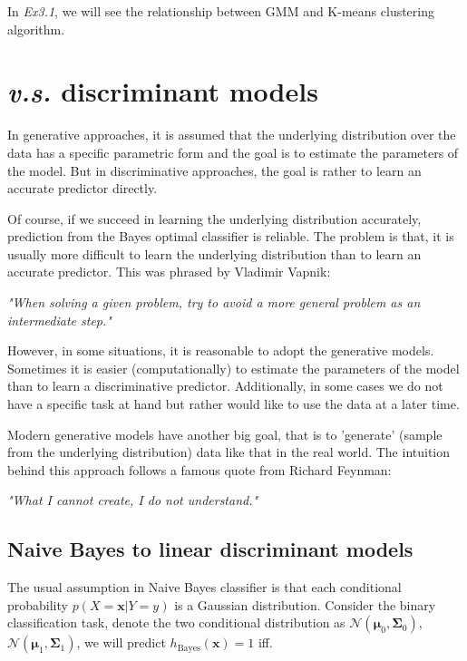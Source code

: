 \documentclass{article}
\begin{document}
	
	In \textit{Ex3.1}, we will see the relationship between GMM and K-means clustering algorithm.
	
\section{\textit{v.s.} discriminant models}
	\label{sec:final}
	In generative approaches, it is assumed that the underlying distribution over the data has a specific parametric form and the goal is to estimate the parameters of the model. But in discriminative approaches, the goal is rather to learn an accurate predictor directly. 
	
	Of course, if we succeed in learning the underlying distribution accurately, prediction from the Bayes optimal classifier is reliable. The problem is that, it is usually more difficult to learn the underlying distribution than to learn an accurate predictor. This was phrased by Vladimir Vapnik:
	\begin{center}
	\textit{"When solving a given problem, try to avoid a more general problem as an intermediate step."}
	\end{center}

	However, in some situations, it is reasonable to adopt the generative models. Sometimes it is easier (computationally) to estimate the parameters of the model than to learn a discriminative predictor. Additionally, in some cases we do not have a specific task at hand but rather would like to use the data at a later time.
	
	Modern generative models have another big goal, that is to 'generate' (sample from the underlying distribution) data like that in the real world. The intuition behind this approach follows a famous quote from Richard Feynman:	
	\begin{center}
	\textit{"What I cannot create, I do not understand."}
	\end{center}

	\subsection{Naive Bayes to linear discriminant models}
	The usual assumption in Naive Bayes classifier is that each conditional probability $p(X=\bm{x}|Y=y)$ is a Gaussian distribution. Consider the binary classification task, denote the two conditional distribution as $\mathcal{N}(\bm{\mu}_0,\bm{\Sigma}_0)$, $\mathcal{N}(\bm{\mu}_1,\bm{\Sigma}_1)$, we will predict $h_{\mathrm{Bayes}}(\bm{x})=1$ iff.
	
\end{document}
